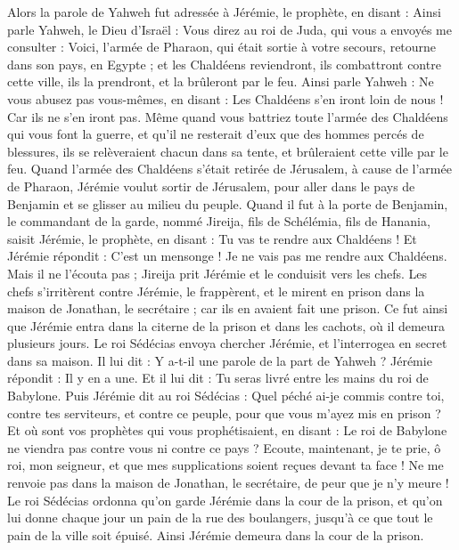 \begin{multicols}{2}
Alors la parole de Yahweh fut adressée à Jérémie, le prophète, en disant :
Ainsi parle Yahweh, le Dieu d'Israël : Vous direz au roi de Juda, qui vous a envoyés me consulter : Voici, l'armée de Pharaon, qui était sortie à votre secours, retourne dans son pays, en Egypte ;
et les Chaldéens reviendront, ils combattront contre cette ville, ils la prendront, et la brûleront par le feu.
Ainsi parle Yahweh : Ne vous abusez pas vous-mêmes, en disant : Les Chaldéens s'en iront loin de nous ! Car ils ne s'en iront pas.
Même quand vous battriez toute l'armée des Chaldéens qui vous font la guerre, et qu'il ne resterait d'eux que des hommes percés de blessures, ils se relèveraient chacun dans sa tente, et brûleraient cette ville par le feu.
Quand l'armée des Chaldéens s'était retirée de Jérusalem, à cause de l'armée de Pharaon,
Jérémie voulut sortir de Jérusalem, pour aller dans le pays de Benjamin et se glisser au milieu du peuple.
Quand il fut à la porte de Benjamin, le commandant de la garde, nommé Jireija, fils de Schélémia, fils de Hanania, saisit Jérémie, le prophète, en disant : Tu vas te rendre aux Chaldéens !
Et Jérémie répondit : C'est un mensonge ! Je ne vais pas me rendre aux Chaldéens. Mais il ne l'écouta pas ; Jireija prit Jérémie et le conduisit vers les chefs.
Les chefs s'irritèrent contre Jérémie, le frappèrent, et le mirent en prison dans la maison de Jonathan, le secrétaire ; car ils en avaient fait une prison.
Ce fut ainsi que Jérémie entra dans la citerne de la prison et dans les cachots, où il demeura plusieurs jours.
Le roi Sédécias envoya chercher Jérémie, et l'interrogea en secret dans sa maison. Il lui dit : Y a-t-il une parole de la part de Yahweh ? Jérémie répondit : Il y en a une. Et il lui dit : Tu seras livré entre les mains du roi de Babylone.
Puis Jérémie dit au roi Sédécias : Quel péché ai-je commis contre toi, contre tes serviteurs, et contre ce peuple, pour que vous m'ayez mis en prison ?
Et où sont vos prophètes qui vous prophétisaient, en disant : Le roi de Babylone ne viendra pas contre vous ni contre ce pays ?
Ecoute, maintenant, je te prie, ô roi, mon seigneur, et que mes supplications soient reçues devant ta face ! Ne me renvoie pas dans la maison de Jonathan, le secrétaire, de peur que je n'y meure !
Le roi Sédécias ordonna qu'on garde Jérémie dans la cour de la prison, et qu'on lui donne chaque jour un pain de la rue des boulangers, jusqu'à ce que tout le pain de la ville soit épuisé. Ainsi Jérémie demeura dans la cour de la prison.

\end{multicols}
